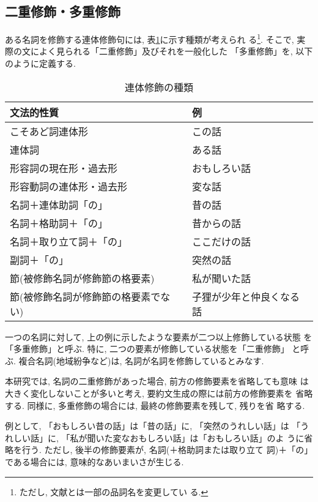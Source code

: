 \subsection{二重修飾・多重修飾}
ある名詞を修飾する連体修飾句には, 表\ref{kindof}に示す種類が考えられ
る\cite{国研文法下}\footnote{ただし, 文献とは一部の品詞名を変更してい
る. }. そこで, 実際の文によく見られる「二重修飾」及びそれを一般化した
「多重修飾」を, 以下のように定義する. 


\begin{table}[htbp]
\begin{center}
\begin{tabular}{|l|l|}
\hline
 文法的性質 & 例 \\
\hline
こそあど詞連体形                & この話 \\
連体詞                          & ある話 \\
形容詞の現在形・過去形          & おもしろい話 \\
形容動詞の連体形・過去形        & 変な話 \\
名詞＋連体助詞「の」            & 昔の話 \\
名詞＋格助詞＋「の」            & 昔からの話 \\
名詞＋取り立て詞＋「の」        & ここだけの話 \\
副詞＋「の」                    & 突然の話 \\
節(被修飾名詞が修飾節の格要素)  & 私が聞いた話 \\
節(被修飾名詞が修飾節の格要素でない) & 子狸が少年と仲良くなる話 \\
\hline
\end{tabular}
\vspace{3mm}
\caption{連体修飾の種類}\label{kindof}
\end{center}
\end{table}

\begin{定義}
一つの名詞に対して, 上の例に示したような要素が二つ以上修飾している状態
を「多重修飾」と呼ぶ. 特に, 二つの要素が修飾している状態を「二重修飾」
と呼ぶ. 複合名詞(地域紛争など)は, 名詞が名詞を修飾しているとみなす. 
\end{定義}

本研究では, 名詞の二重修飾があった場合, 前方の修飾要素を省略しても意味
は大きく変化しないことが多いと考え, 要約文生成の際には前方の修飾要素を
省略する. 同様に, 多重修飾の場合には, 最終の修飾要素を残して, 残りを省
略する.

例として, 「おもしろい昔の話」は「昔の話」に, 「突然のうれしい話」は
「うれしい話」に, 「私が聞いた変なおもしろい話」は「おもしろい話」のよ
うに省略を行う. ただし, 後半の修飾要素が, 名詞(＋格助詞または取り立て
詞)＋「の」である場合には, 意味的なあいまいさが生じる. 

